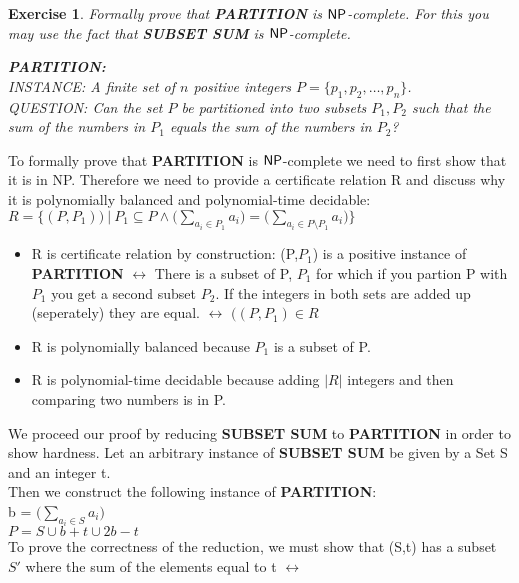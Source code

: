 \documentclass [11pt]{article}
\newtheorem{exercise}[theorem]{Exercise}
\newcommand{\ccfont}[1]{\protect\mathsf{#1}}
\newcommand{\NP}{\ccfont{NP}}
\newcommand{\solution}[1]{\noindent {\bf Solution.}  #1}
\begin{document}
\begin{exercise}
  \label{ex:partition}
  Formally prove that \textbf{PARTITION} is $\NP$-complete. For this you may use
  the fact that \textbf{SUBSET SUM} is $\NP$-complete.   

\medskip     
   
\noindent \textbf{PARTITION:} \\
INSTANCE: A finite set of $n$ positive integers $P=\{p_1, p_2, \ldots, p_n\}$. \\
QUESTION: Can the set $P$ be partitioned into two subsets $P_1, P_2$ such that the sum of the numbers in $P_1$ equals the sum of the numbers in $P_2$? 
  

\end{exercise}



\solution{ 
  To formally prove that \textbf{PARTITION} is $\NP$-complete we need to first show that it is in NP.
  Therefore we need to provide a certificate relation R and discuss why it is polynomially balanced and polynomial-time decidable:\\
  $R=\{(P,P_1)) \ | \  P_1 \subseteq P \wedge \big(\sum_{a_i \in P_1} a_i\big) = \big(\sum_{a_i \in P \setminus P_1} a_i\big) \}$\\
  \begin{itemize}
    \item{
        R is certificate relation by construction: (P,$P_1$) is a positive instance of \textbf{PARTITION} $\leftrightarrow$
        There is a subset of P, $P_1$ for which if you partion P with $P_1$ you get a second subset $P_2$. If the integers in both sets are added up (seperately) they are equal. $\leftrightarrow$ 
      $((P,P_1)\in R$}
    \item{R is polynomially balanced because $P_1$ is a subset of P.}
    \item{R is polynomial-time decidable because adding $|R|$ integers and then comparing two numbers is in P}.
  \end{itemize}
 We proceed our proof by reducing \textbf{SUBSET SUM} to \textbf{PARTITION} in order to show hardness.
 Let an arbitrary instance of \textbf{SUBSET SUM} be given by a Set S and an integer t.\\
 Then we construct the following instance of \textbf{PARTITION}: \\
 b = $\big(\sum_{a_i \in S} a_i \big) $\\
 $P = S \cup b+t \cup 2b-t$ \\
 To prove the correctness of the reduction, we must show that (S,t) has a subset $S'$ where the sum of the elements equal to t $\leftrightarrow$ 
}
\end{document}
